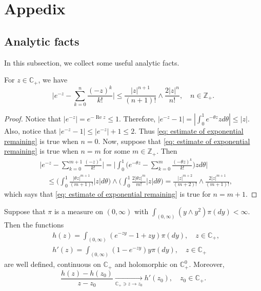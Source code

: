 \documentclass[EJP]{ejpecp} %
\begin{document}
\appendix

\section{Appedix}

\subsection{Analytic facts}
	In this subsection, we collect some useful analytic facts.

\begin{lemma}
\label{lem: estimate of exponential remaining}
	For $z\in \mathbb C_+$,  we have
\begin{equation}
\label{eq: estimate of exponential remaining}
    \Big|e^{-z} - \sum_{k=0}^n \frac{(-z)^k}{k!} \Big|
    \leq \frac{|z|^{n+1}}{(n+1)!} \wedge \frac{2|z|^{n}}{n!}, \quad n\in \mathbb Z_+.
\end{equation}
\end{lemma}

\begin{proof}
  	Notice that $|e^{-z}| = e^{- \operatorname{Re} z} \leq 1$.
  	Therefore, $ |e^{-z} - 1| = | \int_0^1 e^{-\theta z} z d\theta | \leq |z|. $
  	Also, notice that $|e^{-z} - 1| \leq |e^{-z}|+1 \leq 2$.
  	Thus \eqref{eq: estimate of exponential remaining} is true when $n = 0$.
  	Now, suppose that \eqref{eq: estimate of exponential remaining} is true when $n = m$ for some $m \in \mathbb Z_+$.
  	Then
\begin{align}
  	&\Big|e^{-z} - \sum_{k=0}^{m+1} \frac{(-z)^k}{k!}\Big|
   	= \Big| \int_0^1\Big(e^{-\theta z} - \sum_{k=0}^m \frac{(-\theta z)^k}{k!} \Big) z d\theta \Big| \\
    & \quad \leq  \Big(\int_0^1 \frac{|\theta z|^{m+1}}{(m+1)!} |z| d\theta\Big) \wedge \Big(\int_0^1 \frac{2|\theta z|^{m}}{m!} |z| d\theta\Big)
   	= \frac{|z|^{m+2}}{(m+2)!} \wedge \frac{2|z|^{m+1}}{(m+1)!},
\end{align}
	which says that \eqref{eq: estimate of exponential remaining} is true for $n = m + 1$.
\end{proof}

\begin{lemma}
\label{lem: extension lemma for branching mechanism}
	Suppose that  $\pi$ is a measure on $(0,\infty)$ with $\int_{(0,\infty)} (y \wedge y^2) \pi(dy)< \infty$.
	Then the functions
\begin{align}
    & h (z)
   	= \int_{(0,\infty)} (e^{-zy} - 1 + zy) \pi(dy), \quad z \in \mathbb C_+, \\
    & h'(z)
   	= \int_{(0,\infty)}(1- e^{-zy})y \pi(dy), \quad z \in \mathbb C_+
\end{align}
	are well defined, continuous on $\mathbb C_+$ and holomorphic on $\mathbb C_+^0$.
	Moreover,
\[	
	\frac{h(z)-h(z_0)}{z-z_0}
    \xrightarrow[\mathbb C_+\ni z \to z_0]{} h'(z_0),\quad z_0 \in \mathbb C_+.
\]
\end{lemma}
\end{document}
